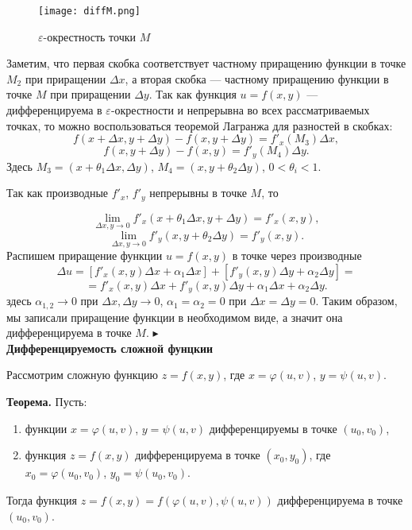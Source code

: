 \documentclass[12pt]{article}
\begin{document}
\begin{figure}[h]
\centering
\texttt{[image: diffM.png]}
\caption{$\varepsilon$-окрестность точки $M$}
\label{fig:mpr}
\end{figure}

Заметим, что первая скобка соответствует частному приращению функции в точке $M_2$ при приращении $\Delta x$, а вторая скобка --- частному приращению функции в точке $M$ при приращении $\Delta y$. Так как функция $u = f(x,y)$  --- дифференцируема в $\varepsilon$-окрестности и непрерывна во всех рассматриваемых точках, то можно воспользоваться теоремой Лагранжа для разностей в скобках:
$$
f(x + \Delta x, y + \Delta y) - f(x, y + \Delta y) = f'_x(M_3) \Delta x,
$$
$$
	f(x, y + \Delta y) - f(x,y) = f'_y(M_4) \Delta y.
$$
Здесь $M_3 = (x + \theta_1 \Delta x, \Delta y)$, $M_4 = (x, y + \theta_2 \Delta y)$, $0 < \theta_i < 1$.


Так как производные $f'_x$, $f'_y$ непрерывны в точке $M$, то

$$
	\lim_{\Delta x,y \rightarrow 0} f'_x(x + \theta_1 \Delta x, y + \Delta y) =f'_x(x,y),
$$
$$
	\lim_{\Delta x,y \rightarrow 0} f'_y(x, y + \theta_2 \Delta y) = f'_y(x,y).
$$
Распишем приращение функции $u = f(x,y)$ в точке через производные  
$$
	\Delta u = [f'_x(x,y)\Delta x + \alpha_1 \Delta x] + [f'_y(x,y) \Delta y + \alpha_2 \Delta y] = 
$$
$$
	= f'_x(x,y)\Delta x + f'_y(x,y) \Delta y + \alpha_1 \Delta x + \alpha_2 \Delta y. 
$$
здесь $\alpha_{1,2} \rightarrow 0$ при $\Delta x, \Delta y \rightarrow 0$, $\alpha_1 = \alpha_2 = 0$ при $\Delta x = \Delta y = 0$.
Таким образом, мы записали приращение функции в необходимом виде, а значит она дифференцируема в точке $M$. $\blacktriangleright$ \\



\textbf{Дифференцируемость сложной фунцкии}

Рассмотрим сложную функцию $z=f(x,y)$, где $x=\varphi(u,v)$, $y = \psi(u,v)$.

\textbf{Теорема.} Пусть: \begin{enumerate}
\item функции $x=\varphi(u,v)$, $y = \psi(u,v)$ дифференцируемы в точке $(u_0, v_0)$,
\item функция $z=f(x,y)$ дифференцируема в точке $(x_0, y_0)$, где 
$x_0 = \varphi(u_0, v_0)$, $y_0 = \psi(u_0, v_0)$.
\end{enumerate}
Тогда функция $z=f(x,y) = f(\varphi(u,v), \psi(u,v))$ дифференцируема в точке $(u_0, v_0)$.
\end{document}
